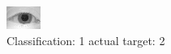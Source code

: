 \begin{figure}[h!]
\begin{center}
\includegraphics[width=0.60\columnwidth]{figures/ID1024_class_1_target_2.png}
\end{center}
\caption{ Classification: 1 actual target: 2}
\label{fig:ID1024_class_1_target_2}
\end{figure}
